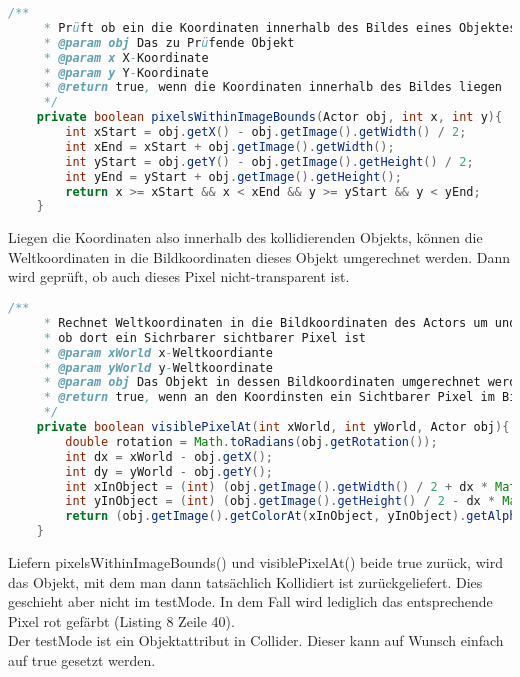 \documentclass{pi1}
\begin{document}
\begin{lstlisting}[caption={\emph{pixelsWithinImageBounds(Actor obj, int x, int y)}-Methode}, firstnumber=97, language=Java]
/**
     * Prüft ob ein die Koordinaten innerhalb des Bildes eines Objektes liegen
     * @param obj Das zu Prüfende Objekt
     * @param x X-Koordinate
     * @param y Y-Koordinate
     * @return true, wenn die Koordinaten innerhalb des Bildes liegen
     */
    private boolean pixelsWithinImageBounds(Actor obj, int x, int y){
        int xStart = obj.getX() - obj.getImage().getWidth() / 2;
        int xEnd = xStart + obj.getImage().getWidth();
        int yStart = obj.getY() - obj.getImage().getHeight() / 2;
        int yEnd = yStart + obj.getImage().getHeight();
        return x >= xStart && x < xEnd && y >= yStart && y < yEnd;
    }
\end{lstlisting}

Liegen die Koordinaten also innerhalb des kollidierenden Objekts, können die Weltkoordinaten in die Bildkoordinaten dieses Objekt umgerechnet werden. Dann wird geprüft, ob auch dieses Pixel nicht-transparent ist.

\begin{lstlisting}[caption={\emph{visiblePixelAt(int xWorld, int yWorld, Actor obj)}-Methode}, firstnumber=80, language=Java]
/**
     * Rechnet Weltkoordinaten in die Bildkoordinaten des Actors um und prüft
     * ob dort ein Sichrbarer sichtbarer Pixel ist
     * @param xWorld x-Weltkoordiante
     * @param yWorld y-Weltkoordinate
     * @param obj Das Objekt in dessen Bildkoordinaten umgerechnet werden soll
     * @return true, wenn an den Koordinsten ein Sichtbarer Pixel im Bild ist
     */
    private boolean visiblePixelAt(int xWorld, int yWorld, Actor obj){
        double rotation = Math.toRadians(obj.getRotation());
        int dx = xWorld - obj.getX();
        int dy = yWorld - obj.getY();
        int xInObject = (int) (obj.getImage().getWidth() / 2 + dx * Math.cos(rotation) + dy * Math.sin(rotation));    
        int yInObject = (int) (obj.getImage().getHeight() / 2 - dx * Math.sin(rotation) + dy * Math.cos(rotation));
        return (obj.getImage().getColorAt(xInObject, yInObject).getAlpha() > 0 );
    }
\end{lstlisting}

Liefern pixelsWithinImageBounds() und visiblePixelAt() beide true zurück, wird das Objekt, mit dem man dann tatsächlich Kollidiert ist zurückgeliefert. Dies geschieht aber nicht im testMode. In dem Fall wird lediglich das entsprechende Pixel rot gefärbt (Listing 8 Zeile 40).\\
Der testMode ist ein Objektattribut in Collider. Dieser kann auf Wunsch einfach auf true gesetzt werden.
\end{document}

